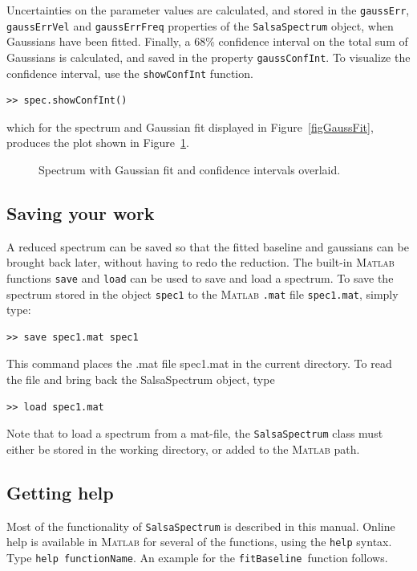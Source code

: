 \documentclass[11pt,a4paper]{article}
\begin{document}
Uncertainties on the parameter values are calculated, and stored in
the \texttt{gaussErr}, \texttt{gaussErrVel} and \texttt{gaussErrFreq}
properties of the \texttt{SalsaSpectrum} object, when Gaussians have
been fitted. Finally, a 68\% confidence interval on the total sum of
Gaussians is calculated, and saved in the property
\texttt{gaussConfInt}. To visualize the confidence interval, use the
\texttt{showConfInt} function.
\begin{lstlisting}
>> spec.showConfInt()
\end{lstlisting}
which for the spectrum and Gaussian fit displayed in
Figure~\ref{figGaussFit}, produces the plot shown in
Figure~\ref{fig:confint}.

\begin{figure}[h!]
  \centering
  \caption{Spectrum with Gaussian fit and confidence intervals overlaid.}
  \label{fig:confint}
\end{figure}

\subsection{Saving your work}
\label{sec:saving-your-work}

A reduced spectrum can be saved so that the fitted baseline and
gaussians can be brought back later, without having to redo the
reduction. The built-in \textsc{Matlab} functions \texttt{save} and
\texttt{load} can be used to save and load a spectrum. To save the
spectrum stored in the object \texttt{spec1} to the
\textsc{\textsc{Matlab}} \texttt{.mat} file \texttt{spec1.mat}, simply
type:
\begin{lstlisting}
>> save spec1.mat spec1
\end{lstlisting}
This command places the .mat file spec1.mat in the current
directory. To read the file and bring back the SalsaSpectrum object,
type
\begin{lstlisting}
>> load spec1.mat
\end{lstlisting}
Note that to load a spectrum from a mat-file, the \texttt{SalsaSpectrum} class
must either be stored in the working directory, or added to the \textsc{Matlab}
path.

\subsection{Getting help}
\label{sec:getting-help}

Most of the functionality of \texttt{SalsaSpectrum} is described in
this manual. Online help is available in \textsc{\textsc{Matlab}} for several of the
functions, using the \texttt{help} syntax. Type \texttt{help
  functionName}. An example for the \texttt{fitBaseline}~function
follows.
\end{document}
